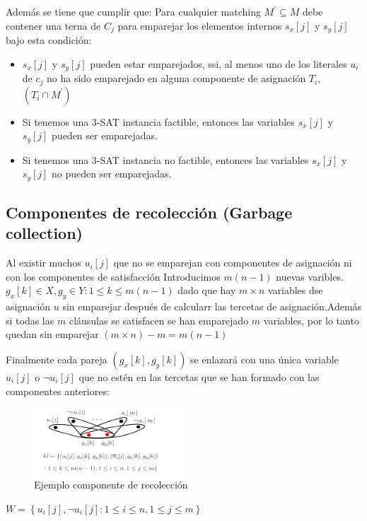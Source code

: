 \documentclass{article}
\begin{document}
Además se tiene que cumplir que:
Para cualquier matching $M^{'} \subseteq M$ debe contener una terna de $C_j$ para emparejar los elementos internos 
$s_x[j]$ y $s_y[j]$ bajo esta condición:
\begin{itemize}
    \item $s_x[j]$ y $s_y[j]$ pueden estar emparejados, ssi, al menos uno de los literales $u_i$ de $c_j$ no ha sido emparejado en alguna componente de asignación
$T_i$,$(T_i \cap M^{'})$
\item Si tenemos una 3-SAT instancia factible, entonces las variables $s_x[j]$ y $s_y[j]$ pueden ser emparejadas.
\item Si tenemos una 3-SAT instancia no factible, entonces las variables $s_x[j]$ y $s_y[j]$ no pueden ser emparejadas.
\end{itemize} 

\subsection{Componentes de recolección (Garbage collection)}
Al existir muchos $u_i[j]$ que no se emparejan con componentes de asignación ni con los componentes de satisfacción
Introducimos $m(n-1)$ nuevas varibles.
$g_x[k] \in X, g_y \in Y : 1\leq k \leq m(n-1)$ dado que
hay $m \times n$ variables dse asignación $u$ sin emparejar después de calcularr las tercetas de asignación.Además si todas las $m$ cláusulas
se satisfacen se han emparejado $m$ variables, por lo tanto quedan sin emparejar $(m \times n) - m = m(n-1)$


Finalmente cada pareja $(g_x[k], g_y[k])$ se enlazará con una única variable $u_i[j]$ o $\lnot u_i[j]$ que no estén en las tercetas que se han formado con las componentes anteriores:

\begin{figure}[H]
    \centering
    \includegraphics[width=0.5\textwidth]{photos/Ejemplo_garbage_componente.png}
    \caption{Ejemplo componente de recolección}
    \label{fig:etiqueta}
\end{figure}

$W = \left\lbrace u_{i}\left[j\right], \lnot u_{i}\left[j\right] : 1 \leq i \leq n, 1 \leq j \leq m \right\rbrace$
\end{document}
